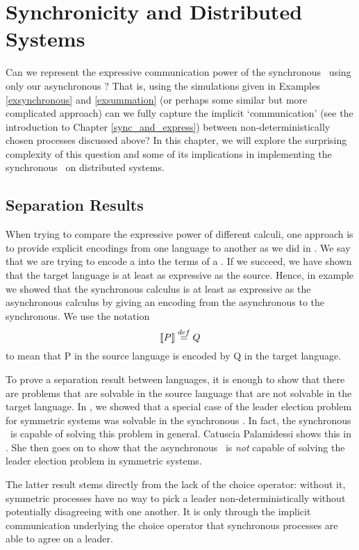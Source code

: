 \chapter{Synchronicity and Distributed Systems}\label{sync_and_dist_sys}
Can we represent the expressive communication power of the synchronous \picalc\ using only our asynchronous \picalc?  That is, using the simulations given in Examples \ref{exsynchronous} and \ref{exsummation} (or perhaps some similar but more complicated approach) can we fully capture the implicit `communication' (see the introduction to Chapter \ref{sync_and_express}) between non-deterministically chosen processes discussed above?  In this chapter, we will explore the surprising complexity of this question and some of its implications in implementing the synchronous \picalc\ on distributed systems.  



\section{Separation Results}\label{Separation Results}
When trying to compare the expressive power of different calculi, one approach is to provide explicit encodings from one language to another as we did in .
We say that we are trying to encode a  into the terms of a . If we succeed, we have shown that the target language is at least as expressive as the source.  
Hence, in example  we showed that the synchronous calculus is at least as expressive as the asynchronous calculus by giving an encoding from the asynchronous to the synchronous.  
We use the notation
\[
	\llbracket{P}\rrbracket \overset{\tiny{def}}{=} Q
\]
to mean that P in the source language is encoded by Q in the target language.

To prove a separation result between languages, it is enough to show that there are problems that are solvable in the source language that are not solvable in the target language.
In , we showed that a special case of the leader election problem for symmetric systems was solvable in the synchronous \picalc.
In fact, the synchronous \picalc\ is capable of solving this problem in general.
Catuscia Palamidessi shows this in \cite{palam03}.
She then goes on to show that the asynchronous \picalc\ is \emph{not} capable of solving the leader election problem in symmetric systems.
 
The latter result stems directly from the lack of the choice operator: without it, symmetric processes have no way to pick a leader non-deterministically without potentially disagreeing with one another.  
It is only through the implicit communication underlying the choice operator that synchronous processes are able to agree on a leader.

